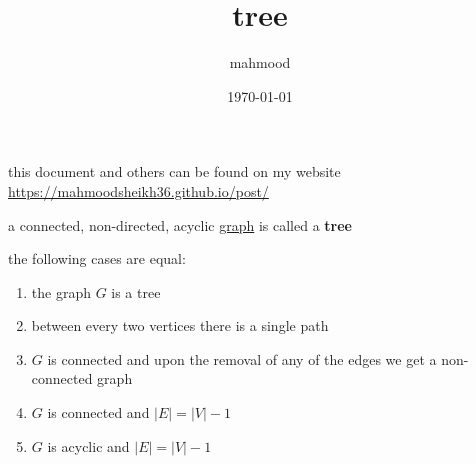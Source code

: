 \documentclass[a4paper,12pt]{article}
\author{mahmood}
\date{\today}
\title{tree}
\begin{document}
\maketitle
\begin{note}
this document and others can be found on my website\\
\url{https://mahmoodsheikh36.github.io/post/}
\end{note}
\begin{definition}
a connected, non-directed, acyclic \href{20230314001051-graph.org}{graph} is called a \textbf{tree}\\
\end{definition}
\begin{lemma}
the following cases are equal:\\
\begin{enumerate}
\item the graph \(G\) is a tree\\
\item between every two vertices there is a single path\\
\item \(G\) is connected and upon the removal of any of the edges we get a non-connected graph\\
\item \(G\) is connected and \(|E|=|V|-1\)\\
\item \(G\) is acyclic and \(|E|=|V|-1\)\\
\end{enumerate}
\end{lemma}
\end{document}
